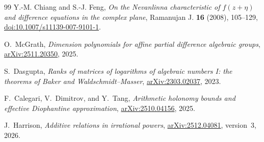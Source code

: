 \documentclass[11pt,oneside]{article}
\theoremstyle{definition}
\theoremstyle{remark}
\begin{document}
\begin{thebibliography}{99}
Y.-M. Chiang and S.-J. Feng,
\emph{On the Nevanlinna characteristic of $f(z+\eta)$ and difference equations in the
complex plane},
Ramanujan J. \textbf{16} (2008), 105--129,
\href{https://doi.org/10.1007/s11139-007-9101-1}{doi:10.1007/s11139-007-9101-1}.

O.~McGrath,
\emph{Dimension polynomials for affine partial difference algebraic groups},
\href{https://arxiv.org/abs/2511.20350}{arXiv:2511.20350}, 2025.

S.~Dasgupta,
\emph{Ranks of matrices of logarithms of algebraic numbers I: the theorems of Baker and
Waldschmidt--Masser},
\href{https://arxiv.org/abs/2303.02037}{arXiv:2303.02037}, 2023.

F.~Calegari, V.~Dimitrov, and Y.~Tang,
\emph{Arithmetic holonomy bounds and effective Diophantine approximation},
\href{https://arxiv.org/abs/2510.04156}{arXiv:2510.04156}, 2025.

J.~Harrison,
\emph{Additive relations in irrational powers},
\href{https://arxiv.org/abs/2512.04081}{arXiv:2512.04081}, version~3, 2026.

\end{thebibliography}
\end{document}

